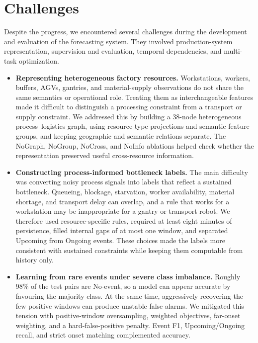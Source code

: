 \chapter{Challenges}
\label{ch:challenges}

Despite the progress, we encountered several challenges during the development and evaluation of the forecasting system. They involved production-system representation, supervision and evaluation, temporal dependencies, and multi-task optimization.

\begin{itemize}[leftmargin=1.7em,itemsep=0.55\baselineskip,topsep=0.35\baselineskip]
\item \textbf{Representing heterogeneous factory resources.} Workstations, workers, buffers, AGVs, gantries, and material-supply observations do not share the same semantics or operational role. Treating them as interchangeable features made it difficult to distinguish a processing constraint from a transport or supply constraint. We addressed this by building a 38-node heterogeneous process--logistics graph, using resource-type projections and semantic feature groups, and keeping geographic and semantic relations separate. The NoGraph, NoGroup, NoCross, and NoInfo ablations helped check whether the representation preserved useful cross-resource information.

\item \textbf{Constructing process-informed bottleneck labels.} The main difficulty was converting noisy process signals into labels that reflect a sustained bottleneck. Queueing, blockage, starvation, worker availability, material shortage, and transport delay can overlap, and a rule that works for a workstation may be inappropriate for a gantry or transport robot. We therefore used resource-specific rules, required at least eight minutes of persistence, filled internal gaps of at most one window, and separated Upcoming from Ongoing events. These choices made the labels more consistent with sustained constraints while keeping them computable from history only.

\item \textbf{Learning from rare events under severe class imbalance.} Roughly 98\% of the test pairs are No-event, so a model can appear accurate by favouring the majority class. At the same time, aggressively recovering the few positive windows can produce unstable false alarms. We mitigated this tension with positive-window oversampling, weighted objectives, far-onset weighting, and a hard-false-positive penalty. Event F1, Upcoming/Ongoing recall, and strict onset matching complemented accuracy.


\end{itemize}
